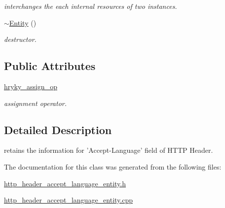 \begin{DoxyCompactItemize}
\begin{DoxyCompactList}\small\item\em interchanges the each internal resources of two instances. \end{DoxyCompactList}\item 
\hypertarget{classhryky_1_1http_1_1header_1_1accept_1_1language_1_1_entity_a4e1c28428b5694961a2333e30cffa9d8}{\hyperlink{classhryky_1_1http_1_1header_1_1accept_1_1language_1_1_entity_a4e1c28428b5694961a2333e30cffa9d8}{$\sim$\-Entity} ()}\label{classhryky_1_1http_1_1header_1_1accept_1_1language_1_1_entity_a4e1c28428b5694961a2333e30cffa9d8}

\begin{DoxyCompactList}\small\item\em destructor. \end{DoxyCompactList}\end{DoxyCompactItemize}
\subsection*{Public Attributes}
\begin{DoxyCompactItemize}
\item 
\hypertarget{classhryky_1_1http_1_1header_1_1accept_1_1language_1_1_entity_a3ec0e37ef8a614c500a949b66aa62388}{\hyperlink{classhryky_1_1http_1_1header_1_1accept_1_1language_1_1_entity_a3ec0e37ef8a614c500a949b66aa62388}{hryky\-\_\-assign\-\_\-op}}\label{classhryky_1_1http_1_1header_1_1accept_1_1language_1_1_entity_a3ec0e37ef8a614c500a949b66aa62388}

\begin{DoxyCompactList}\small\item\em assignment operator. \end{DoxyCompactList}\end{DoxyCompactItemize}


\subsection{Detailed Description}
retains the information for 'Accept-\/\-Language' field of H\-T\-T\-P Header. 

The documentation for this class was generated from the following files\-:\begin{DoxyCompactItemize}
\item 
\hyperlink{http__header__accept__language__entity_8h}{http\-\_\-header\-\_\-accept\-\_\-language\-\_\-entity.\-h}\item 
\hyperlink{http__header__accept__language__entity_8cpp}{http\-\_\-header\-\_\-accept\-\_\-language\-\_\-entity.\-cpp}\end{DoxyCompactItemize}
